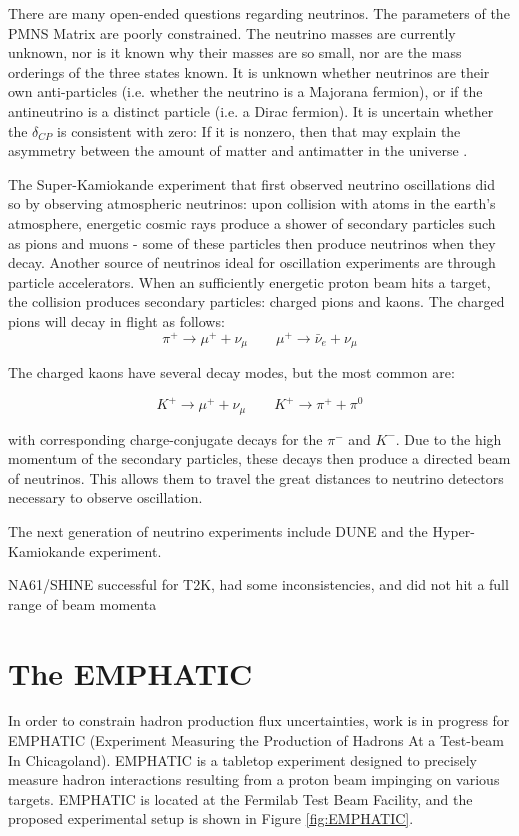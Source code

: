 There are many open-ended questions regarding neutrinos.
The parameters of the PMNS Matrix are poorly constrained.
The neutrino masses are currently unknown, nor is it known why their masses are so small, nor are the mass orderings of the three states known.
It is unknown whether neutrinos are their own anti-particles (i.e. whether the neutrino is a Majorana fermion), or if the antineutrino is a distinct particle (i.e. a Dirac fermion). It is uncertain whether the $\delta_{CP}$ is consistent with zero: If it is nonzero, then that may explain the asymmetry between the amount of matter and antimatter in the universe \cite{neutrinoCP}.

The Super-Kamiokande experiment that first observed neutrino oscillations did so by observing atmospheric neutrinos: upon collision with atoms in the earth's atmosphere, energetic cosmic rays produce a shower of secondary particles such as pions and muons - some of these particles then produce neutrinos when they decay. Another source of neutrinos ideal for oscillation experiments are through particle accelerators. When an sufficiently energetic proton beam hits a target, the collision produces secondary particles: charged pions and kaons. The charged pions will decay in flight as follows:
$$ \pi^+ \rightarrow \mu^+ + \nu_\mu \quad \quad \mu^+ \rightarrow \bar{\nu}_e + \nu_\mu$$

The charged kaons have several decay modes, but the most common are:

$$ K^+ \rightarrow \mu^+ + \nu_\mu \quad \quad K^+ \rightarrow \pi^+ + \pi^0$$

with corresponding charge-conjugate decays for the $\pi^-$ and $K^-$. Due to the high momentum of the secondary particles, these decays then produce a directed beam of neutrinos. This allows them to travel the great distances to neutrino detectors necessary to observe oscillation.

The next generation of neutrino experiments include DUNE and the Hyper-Kamiokande experiment. 

NA61/SHINE successful for T2K, had some inconsistencies, and did not hit a full range of beam momenta

 \section{The \ac{EMPHATIC}}

In order to constrain hadron production flux uncertainties, work is in progress for \ac{EMPHATIC} (Experiment Measuring the Production of Hadrons At a Test-beam In Chicagoland). \ac{EMPHATIC} is a tabletop experiment designed to precisely measure hadron interactions resulting from a proton beam impinging on various targets. \ac{EMPHATIC} is located at the Fermilab Test Beam Facility, and the proposed experimental setup is shown in Figure \ref{fig:EMPHATIC}.


